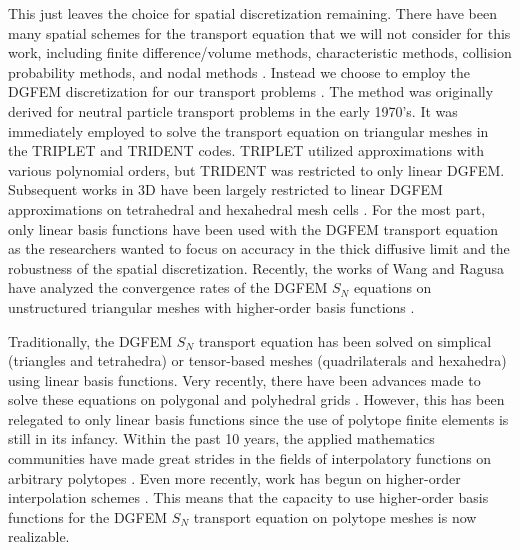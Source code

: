 This just leaves the choice for spatial discretization remaining. There have been many spatial schemes for the transport equation that we will not consider for this work, including finite difference/volume methods, characteristic methods, collision probability methods, and nodal methods \cite{bell1979nuclear,morel1999self,askew1972characteristics,alcouffe1981review,sanchez1982review}. Instead we choose to employ the DGFEM discretization for our transport problems \cite{reed1973triangularmesh,lesaint1974finite}. The method was originally derived for neutral particle transport problems in the early 1970's. It was immediately employed to solve the transport equation on triangular meshes in the TRIPLET \cite{reed1973triplet} and TRIDENT \cite{seed1977trident,seed1978trident} codes. TRIPLET utilized approximations with various polynomial orders, but TRIDENT was restricted to only linear DGFEM. Subsequent works in 3D have been largely restricted to linear DGFEM approximations on tetrahedral and hexahedral mesh cells \cite{wareing2001discontinuous,morel2005s}. For the most part, only linear basis functions have been used with the DGFEM transport equation as the researchers wanted to focus on accuracy in the thick diffusive limit and the robustness of the spatial discretization. Recently, the works of Wang and Ragusa have analyzed the convergence rates of the DGFEM $S_N$ equations on unstructured triangular meshes with higher-order basis functions \cite{wang2009convergence,wang2009high}.

Traditionally, the DGFEM $S_N$ transport equation has been solved on simplical (triangles and tetrahedra) or tensor-based meshes (quadrilaterals and hexahedra) using linear basis functions. Very recently, there have been advances made to solve these equations on polygonal and polyhedral grids \cite{davidson2008finite,ref::PWLD_stone_adams,ref::PWLD_stone_adams_unstructured,bailey2008phd}. However, this has been relegated to only linear basis functions since the use of polytope finite elements is still in its infancy. Within the past 10 years, the applied mathematics communities have made great strides in the fields of interpolatory functions on arbitrary polytopes \cite{sukumar2006recent}. Even more recently, work has begun on higher-order interpolation schemes \cite{rand2013interpolation}. This means that the capacity to use higher-order basis functions for the DGFEM $S_N$ transport equation on polytope meshes is now realizable. 

